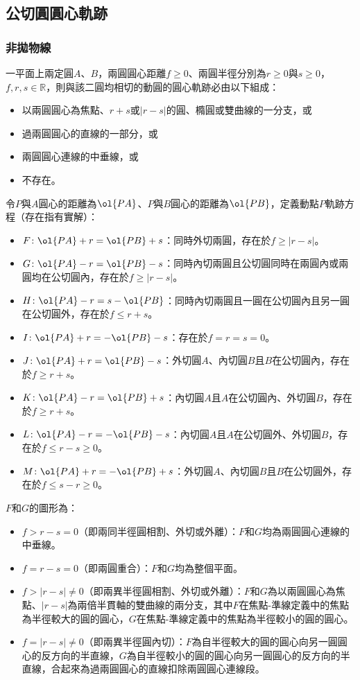 \documentclass[a4paper,12pt]{article}
\begin{document}
\subsection{公切圓圓心軌跡}
\subsubsection{非拋物線}
一平面上兩定圓$A$、$B$，兩圓圓心距離$f\geq 0$、兩圓半徑分別為$r\geq 0$與$s\geq 0$，$f,r,s\in\mathbb{R}$，則與該二圓均相切的動圓的圓心軌跡必由以下組成：
\begin{itemize}
\item 以兩圓圓心為焦點、$r+s$或$|r-s|$的圓、橢圓或雙曲線的一分支，或
\item 過兩圓圓心的直線的一部分，或
\item 兩圓圓心連線的中垂線，或
\item 不存在。
\end{itemize}
令$P$與$A$圓心的距離為$\ol{PA}$、$P$與$B$圓心的距離為$\ol{PB}$，定義動點$P$軌跡方程（存在指有實解）：
\begin{itemize}
\item $F\colon\ol{PA}+r=\ol{PB}+s$：同時外切兩圓，存在於$f\geq|r-s|$。
\item $G\colon\ol{PA}-r=\ol{PB}-s$：同時內切兩圓且公切圓同時在兩圓內或兩圓均在公切圓內，存在於$f\geq|r-s|$。
\item $H\colon\ol{PA}-r=s-\ol{PB}$：同時內切兩圓且一圓在公切圓內且另一圓在公切圓外，存在於$f\leq r+s$。
\item $I\colon\ol{PA}+r=-\ol{PB}-s$：存在於$f=r=s=0$。
\item $J\colon\ol{PA}+r=\ol{PB}-s$：外切圓$A$、內切圓$B$且$B$在公切圓內，存在於$f\geq r+s$。
\item $K\colon\ol{PA}-r=\ol{PB}+s$：內切圓$A$且$A$在公切圓內、外切圓$B$，存在於$f\geq r+s$。
\item $L\colon\ol{PA}-r=-\ol{PB}-s$：內切圓$A$且$A$在公切圓外、外切圓$B$，存在於$f\leq r-s\geq 0$。
\item $M\colon\ol{PA}+r=-\ol{PB}+s$：外切圓$A$、內切圓$B$且$B$在公切圓外，存在於$f\leq s-r\geq 0$。
\end{itemize}
$F$和$G$的圖形為：
\begin{itemize}
\item $f>r-s=0$（即兩同半徑圓相割、外切或外離）：$F$和$G$均為兩圓圓心連線的中垂線。
\item $f=r-s=0$（即兩圓重合）：$F$和$G$均為整個平面。
\item $f>|r-s|\neq 0$（即兩異半徑圓相割、外切或外離）：$F$和$G$為以兩圓圓心為焦點、$|r-s|$為兩倍半貫軸的雙曲線的兩分支，其中$F$在焦點-準線定義中的焦點為半徑較大的圓的圓心，$G$在焦點-準線定義中的焦點為半徑較小的圓的圓心。
\item $f=|r-s|\neq 0$（即兩異半徑圓內切）：$F$為自半徑較大的圓的圓心向另一圓圓心的反方向的半直線，$G$為自半徑較小的圓的圓心向另一圓圓心的反方向的半直線，合起來為過兩圓圓心的直線扣除兩圓圓心連線段。
\end{itemize}
\end{document}
